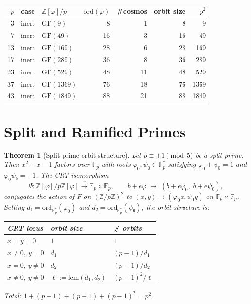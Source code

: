 \documentclass[12pt]{article}
\newtheorem{theorem}{Theorem}
\begin{document}
\begin{center}
\begin{tabular}{rllrrrr}
\toprule
$p$ & case & $\mathbb{Z}[\varphi]/p$ & $\mathrm{ord}(\varphi)$ & \#cosmos & orbit size & $p^2$ \\
\midrule
3  & inert & $\mathrm{GF}(9)$   & 8  & 1  & 8  & 9   \\
7  & inert & $\mathrm{GF}(49)$  & 16 & 3  & 16 & 49  \\
13 & inert & $\mathrm{GF}(169)$ & 28 & 6  & 28 & 169 \\
17 & inert & $\mathrm{GF}(289)$ & 36 & 8  & 36 & 289 \\
23 & inert & $\mathrm{GF}(529)$ & 48 & 11 & 48 & 529 \\
37 & inert & $\mathrm{GF}(1369)$& 76 & 18 & 76 & 1369\\
43 & inert & $\mathrm{GF}(1849)$& 88 & 21 & 88 & 1849\\
\bottomrule
\end{tabular}
\end{center}

\section{Split and Ramified Primes}

\begin{theorem}[Split prime orbit structure]\label{thm:split}
Let $p\equiv\pm1\pmod5$ be a split prime.  Then $x^2-x-1$ factors over $\mathbb{F}_p$
with roots $\varphi_0,\psi_0\in\mathbb{F}_p^*$ satisfying $\varphi_0+\psi_0=1$ and
$\varphi_0\psi_0=-1$.  The CRT isomorphism
\[
  \Psi:\mathbb{Z}[\varphi]/p\mathbb{Z}[\varphi]\xrightarrow{\;\sim\;}\mathbb{F}_p\times\mathbb{F}_p,
  \qquad
  b+e\varphi\;\mapsto\;(b+e\varphi_0,\;b+e\psi_0),
\]
conjugates the action of $F$ on $(\mathbb{Z}/p\mathbb{Z})^2$ to $(x,y)\mapsto(\varphi_0 x,\psi_0 y)$
on $\mathbb{F}_p\times\mathbb{F}_p$.  Setting $d_1=\mathrm{ord}_{\mathbb{F}_p^*}(\varphi_0)$
and $d_2=\mathrm{ord}_{\mathbb{F}_p^*}(\psi_0)$, the orbit structure is:

\begin{center}
\renewcommand{\arraystretch}{1.2}
\begin{tabular}{lll}
\toprule
CRT locus & orbit size & \# orbits \\
\midrule
$x=y=0$ & $1$ & $1$ \\
$x\ne0,\ y=0$ & $d_1$ & $(p-1)/d_1$ \\
$x=0,\ y\ne0$ & $d_2$ & $(p-1)/d_2$ \\
$x\ne0,\ y\ne0$ & $\ell:=\mathrm{lcm}(d_1,d_2)$ & $(p-1)^2/\ell$ \\
\bottomrule
\end{tabular}
\end{center}

\noindent
Total: $1+(p-1)+(p-1)+(p-1)^2=p^2$. \checkmark
\end{theorem}
\end{document}
